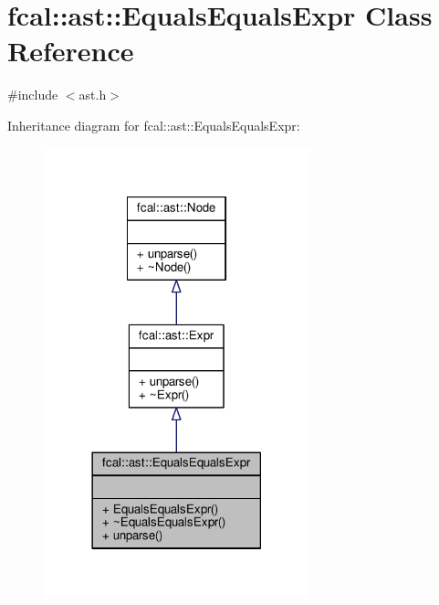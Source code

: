 \hypertarget{classfcal_1_1ast_1_1EqualsEqualsExpr}{}\section{fcal\+:\+:ast\+:\+:Equals\+Equals\+Expr Class Reference}
\label{classfcal_1_1ast_1_1EqualsEqualsExpr}


{\ttfamily \#include $<$ast.\+h$>$}



Inheritance diagram for fcal\+:\+:ast\+:\+:Equals\+Equals\+Expr\+:
\nopagebreak
\begin{figure}[H]
\begin{center}
\leavevmode
\includegraphics[width=218pt]{classfcal_1_1ast_1_1EqualsEqualsExpr__inherit__graph}
\end{center}
\end{figure}



